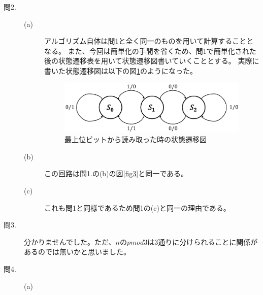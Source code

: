 \documentclass{jsarticle}
\begin{document}
\begin{description}
      \item[問2.]
      \begin{description}
          \item[(a)]
          アルゴリズム自体は問1と全く同一のものを用いて計算することとなる。
          また、今回は簡単化の手間を省くため、問1で簡単化された後の状態遷移表を用いて状態遷移図書いていくこととする。
          実際に書いた状態遷移図は以下の図\ref{fig4}のようになった。
          \begin{figure}[H]
              \centering
              \includegraphics[width = 10cm]{fig_4.eps}
              \caption{最上位ビットから読み取った時の状態遷移図}
              \label{fig4}
          \end{figure}

          \item[(b)]
          この回路は問1.の(b)の図\ref{fig3}と同一である。

          \item[(c)]
          これも問1と同様であるため問1の(c)と同一の理由である。
      \end{description}

      \item[問3.]
      分かりませんでした。ただ、$n$の$pmod 3$は3通りに分けられることに関係があるのでは無いかと思いました。

      \item[問4.]
      \begin{description}
          \item[(a)]
          
      \end{description}
  \end{description}
\end{document}
